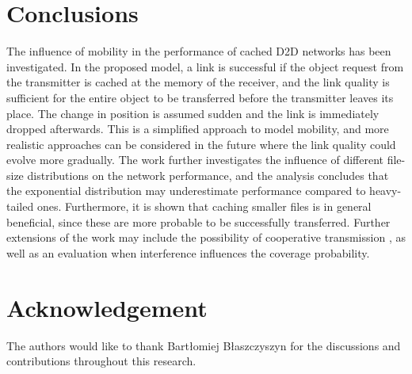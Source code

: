 \documentclass[conference]{IEEEtran}
\begin{document}
\section{Conclusions}
\label{secVI}
The influence of mobility in the performance of cached D2D networks has been investigated. In the proposed model, a link is successful if the object request from the transmitter is cached at the memory of the receiver, and the link quality is sufficient for the entire object to be transferred before the transmitter leaves its place. The change in position is assumed sudden and the link is immediately dropped afterwards. This is a simplified approach to model mobility, and more realistic approaches can be considered in the future where the link quality could evolve more gradually. The work further investigates the influence of different file-size distributions on the network performance, and the analysis concludes that the exponential distribution may underestimate performance compared to heavy-tailed ones. Furthermore, it is shown that caching smaller files is in general beneficial, since these are more probable to be successfully transferred. Further extensions of the work may include the possibility of cooperative transmission \cite{QuekCoopCache16}, as well as an evaluation when interference influences the coverage probability. 

\section{Acknowledgement}
The authors would like to thank Bart{\l}omiej B{\l}aszczyszyn for the discussions and contributions throughout this research.




\end{document}
